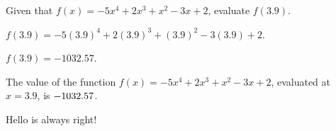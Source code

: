 \documentclass{ximera}
\begin{document}



\begin{exercise}
Given that $f(x)=-5 x^4+2 x^3+x^2-3 x+2$, evaluate $f(3.9)$.
\begin{solution}
\begin{hint}
$f(3.9)=-5 (3.9)^4+2 (3.9)^3+(3.9)^2-3 (3.9)+2$.
\end{hint}
\begin{hint}
$f(3.9)=-1032.57$.
\end{hint}
The value of the function $f(x) = -5 x^4+2 x^3+x^2-3 x+2$, evaluated at $x=3.9$, is ${-1032.57}$.
\end{solution}
\end{exercise}


\begin{question}
\begin{multiple-choice}
\end{multiple-choice}
\begin{solution}
\begin{hint}
Hello is always right!
\end{hint}
\end{solution}
\end{question}
\end{document}
